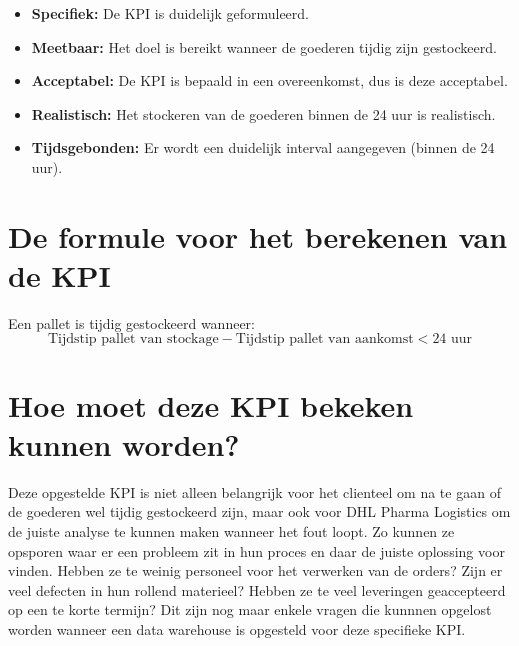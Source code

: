 \begin{itemize}
	\item \textbf{Specifiek: } De KPI is duidelijk geformuleerd.
	\item \textbf{Meetbaar: } Het doel is bereikt wanneer de goederen tijdig zijn gestockeerd.
	\item \textbf{Acceptabel:} De KPI is bepaald in een overeenkomst, dus is deze acceptabel.
	\item \textbf{Realistisch: } Het stockeren van de goederen binnen de 24 uur is realistisch.
	\item \textbf{Tijdsgebonden: } Er wordt een duidelijk interval aangegeven (binnen de 24 uur).
\end{itemize} 

\section{De formule voor het berekenen van de KPI}
Een pallet is tijdig gestockeerd wanneer:
\begin{equation*}
	\text{Tijdstip pallet van stockage} - \text{Tijdstip pallet van aankomst} < \text{24 uur}
\end{equation*}

\section{Hoe moet deze KPI bekeken kunnen worden?}
Deze opgestelde KPI is niet alleen belangrijk voor het clienteel om na te gaan of de goederen wel tijdig gestockeerd zijn, maar ook voor DHL Pharma Logistics om de juiste analyse te kunnen maken wanneer het fout loopt. Zo kunnen ze opsporen waar er een probleem zit in hun proces en daar de juiste oplossing voor vinden. Hebben ze te weinig personeel voor het verwerken van de orders? Zijn er veel defecten in hun rollend materieel? Hebben ze te veel leveringen geaccepteerd op een te korte termijn? Dit zijn nog maar enkele vragen die kunnnen opgelost worden wanneer een data warehouse is opgesteld voor deze specifieke KPI.